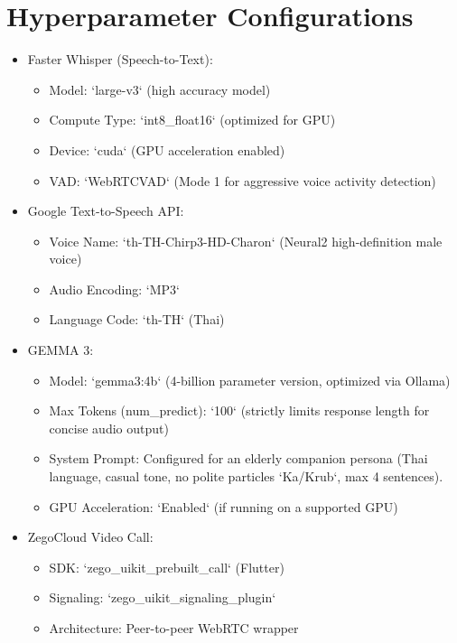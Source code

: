 \section{Hyperparameter Configurations}
\begin{itemize}
	\item Faster Whisper (Speech-to-Text):
	\begin{itemize}
		\item Model: `large-v3` (high accuracy model)
		\item Compute Type: `int8\_float16` (optimized for GPU)
		\item Device: `cuda` (GPU acceleration enabled)
		\item VAD: `WebRTCVAD` (Mode 1 for aggressive voice activity detection)
	\end{itemize}
	
	\item Google Text-to-Speech API:
	\begin{itemize}
		\item Voice Name: `th-TH-Chirp3-HD-Charon` (Neural2 high-definition male voice)
		\item Audio Encoding: `MP3`
		\item Language Code: `th-TH` (Thai)
	\end{itemize}
	
	\item GEMMA 3:  
	\begin{itemize}
		\item Model: `gemma3:4b` (4-billion parameter version, optimized via Ollama)
		\item Max Tokens (num\_predict): `100` (strictly limits response length for concise audio output)
		\item System Prompt: Configured for an elderly companion persona (Thai language, casual tone, no polite particles `Ka/Krub`, max 4 sentences).
		\item GPU Acceleration: `Enabled` (if running on a supported GPU)
	\end{itemize}
	
	\item ZegoCloud Video Call: 
	\begin{itemize}
		\item SDK: `zego\_uikit\_prebuilt\_call` (Flutter)
		\item Signaling: `zego\_uikit\_signaling\_plugin`
		\item Architecture: Peer-to-peer WebRTC wrapper
	\end{itemize}
\end{itemize}
\newpage
